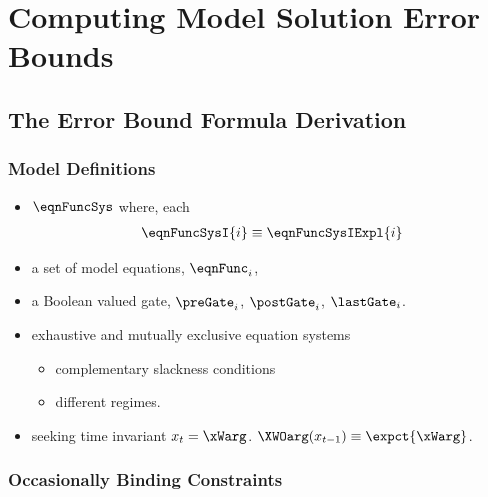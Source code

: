 \documentclass[notheorems]{beamer}
\begin{document}
\section{Computing Model Solution Error Bounds}
\label{sec:solnerrorbounds}

\subsection{The Error Bound Formula Derivation}
\label{sec:errorformula}
\begin{frame}
  \frametitle{Model Definitions}
  
\begin{itemize}
\item $\eqnFuncSys$ where, each 
\begin{gather*}
\eqnFuncSysI{i}\equiv \eqnFuncSysIExpl{i} 
\end{gather*}
\item a set of model equations, $\eqnFunc_i$, 
\item  a Boolean valued gate, $\preGate_i$, $\postGate_i$,
$\lastGate_i$. 
\item exhaustive and mutually exclusive equation systems 
  \begin{itemize}
  \item complementary slackness conditions 
\item different regimes. 
  \end{itemize}
\item seeking time invariant $x_t=\xWarg$.  $\XWOarg(x_{t-1})\equiv \expct{\xWarg}$.
\end{itemize}

\end{frame}



\subsubsection{Occasionally Binding Constraints}
\label{sec:obc-solut}
\end{document}
